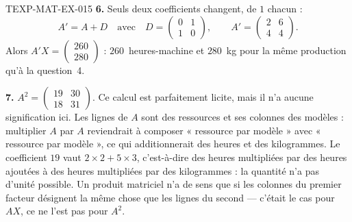 \begin{corrige}{TEXP-MAT-EX-015}
\textbf{6.} Seuls deux coefficients changent, de $1$ chacun :
\[
  A'=A+D \quad\text{avec}\quad D=\begin{pmatrix}0&1\\1&0\end{pmatrix},
  \qquad A'=\begin{pmatrix}2&6\\4&4\end{pmatrix}.
\]
Alors $A'X=\begin{pmatrix}260\\280\end{pmatrix}$ : $260$~heures-machine et
$280$~kg pour la même production qu'à la question~4.

\textbf{7.} $A^2=\begin{pmatrix}19&30\\18&31\end{pmatrix}$. Ce calcul est
parfaitement licite, mais il n'a aucune signification ici. Les lignes de $A$ sont
des ressources et ses colonnes des modèles : multiplier $A$ par $A$ reviendrait à
composer « ressource par modèle » avec « ressource par modèle », ce qui
additionnerait des heures et des kilogrammes. Le coefficient $19$ vaut
$2\times2+5\times3$, c'est-à-dire des heures multipliées par des heures ajoutées
à des heures multipliées par des kilogrammes : la quantité n'a pas d'unité
possible. Un produit matriciel n'a de sens que si les colonnes du premier facteur
désignent la même chose que les lignes du second — c'était le cas pour $AX$, ce ne
l'est pas pour $A^2$.
\end{corrige}

